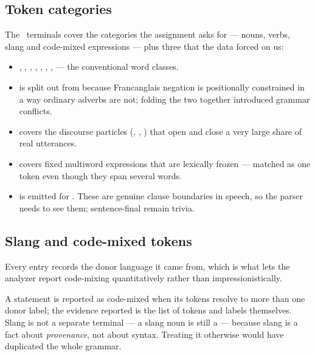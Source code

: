 \subsection{Token categories}



The \TerminalCount\ terminals cover the categories the assignment asks for --- nouns,
verbs, slang and code-mixed expressions --- plus three that the data forced on us:

\begin{itemize}[leftmargin=1.4em, itemsep=0.15em]
  \item {}, , , , , ,
        ,  --- the conventional word classes.
  \item {} is split out from  because Francanglais negation is
        positionally constrained in a way ordinary adverbs are not; folding the two
        together introduced grammar conflicts.
  \item {} covers the discourse particles (, , ) that
        open and close a very large share of real utterances.
  \item {} covers fixed multiword expressions that are lexically frozen ---
        matched as one token even though they span several words.
  \item {} is emitted for \term{,} \term{;} \term{:}. These are genuine clause
        boundaries in speech, so the parser needs to see them; sentence-final
         remain trivia.
\end{itemize}

\subsection{Slang and code-mixed tokens}

Every entry records the donor language it came from, which is what lets the analyzer
report code-mixing quantitatively rather than impressionistically.



A statement is reported as code-mixed when its tokens resolve to more than one donor
label; the evidence reported is the list of tokens and labels themselves. Slang is not a
separate terminal --- a slang noun is still a  --- because slang is a fact about
\emph{provenance}, not about syntax. Treating it otherwise would have duplicated the whole
grammar.

